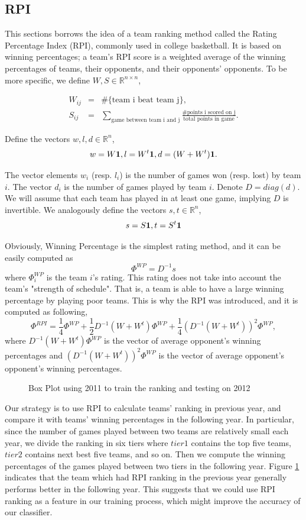 \documentclass{article}
\begin{document}
	\subsection{RPI}
	This sections borrows the idea of a team ranking method called the Rating Percentage Index (RPI), commonly used in college basketball. It is based on winning percentages; a team's RPI score is a weighted average of the winning percentages of teams, their opponents, and their opponents' opponents. To be more specific, we define $W,S\in \mathbb{R}^{n\times n}$,
	
	\begin{eqnarray}
	W_{ij}&=&\#\{\text{team i beat team j}\},\\
	S_{ij}&=&\sum_{\text{game between team i and j}}\frac{\#\text{points i scored on j}}{\text{total points in game}}.
	\end{eqnarray}

	Define the vectors $w,l,d \in \mathbb{R}^n$, 
	$$w=W\bold{1}, l=W^t\bold{1}, d=(W+W^t)\bold{1}.$$
	\par The vector elements $w_i$ (resp. $l_i$) is the number of games won (resp. lost) by team $i$. The vector $d_i$ is the number of games played by team $i$. Denote $D=diag(d)$. We will assume that each team has played in at least one game, implying $D$ is invertible. We analogously define the vectors $s,t\in \mathbb{R}^n$, 
	$$s=S\bold{1}, t=S^t\bold{1}$$
	\par Obviously, Winning Percentage is the simplest rating method, and it can be easily computed as
	$$\Phi^{WP}=D^{-1}s$$
	where $\Phi_i^{WP}$ is the team $i$'s rating. This rating does not take into account the team's "strength of schedule". That is, a team is able to have a large winning percentage by playing poor teams. This is why the RPI was introduced, and it is computed as following,
	$$\Phi^{RPI}=\frac{1}{4}\Phi^{WP}+\frac{1}{2}D^{-1}(W+W^t)\Phi^{WP}+\frac{1}{4}(D^{-1}(W+W^t))^2\Phi^{WP},$$
	where $D^{-1}(W+W^t)\Phi^{WP}$ is the vector of average opponent's winning percentages and $(D^{-1}(W+W^t))^2\Phi^{WP}$ is the vector of average opponent's opponent's winning percentages. \\

	\begin{figure}[h]
	\centerline{}
	\caption{Box Plot using 2011 to train the ranking and testing on 2012}
	\label{f1}
	\end{figure} 

	Our strategy is to use RPI to calculate teams' ranking in previous year, and compare it with teams' winning percentages in the following year.	In particular, since the number of games played between two teams are relatively small each year, we divide the ranking in six tiers where $tier1$ contains the top five teams, $tier2$ contains next best five teams, and so on. Then we compute the winning percentages of the games played between two tiers in the following year. Figure \ref{f1} indicates that the team which had RPI ranking in the previous year generally performs better in the following year. This suggests that we could use RPI ranking as a feature in our training process, which might improve the accuracy of our classifier.
\end{document}
